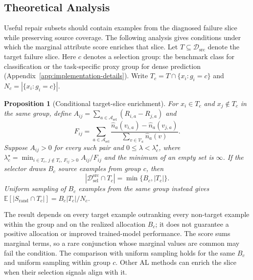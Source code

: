 \documentclass[10pt,twocolumn,letterpaper]{article}
\newcommand{\dataset}{\mathcal{D}}
\newcommand{\selattrs}{\mathcal{A}_{\mathrm{sel}}}
\newcommand{\vals}{\mathcal{V}}
\newtheorem{proposition}{Proposition}
\begin{document}
\subsection{Theoretical Analysis}
\label{subsec:slice-enrichment}

Useful repair subsets should contain examples from the diagnosed failure slice while preserving source coverage. The following analysis gives conditions under which the marginal attribute score enriches that slice. Let $T\subseteq\dataset_{\mathrm{src}}$ denote the target failure slice. Here $c$ denotes a selection group: the benchmark class for classification or the task-specific proxy group for dense prediction (Appendix~\ref{app:implementation-details}). Write $T_c=T\cap\{x_i:g_i=c\}$ and $N_c=|\{x_i:g_i=c\}|$.

\begin{tcolorbox}[
    colback=blue!2!white,
    colframe=blue!20!white,
    arc=3pt,
    boxrule=1pt,
    before skip=3pt,
    after skip=3pt,
    top=3pt,
    bottom=3pt,
    boxsep=1pt,
    drop shadow,
    breakable
]
\begin{proposition}[Conditional target-slice enrichment]
\label{prop:rarity-margin}
For $x_i\in T_c$ and $x_j\notin T_c$ in the same group, define $A_{ij}=\sum_{a\in\selattrs}(R_{i,a}-R_{j,a})$ and
\begin{equation*}
F_{ij}=\sum_{a\in\selattrs}
\frac{\hat n_a(v_{i,a})-\hat n_a(v_{j,a})}{\sum_{v\in\vals_a}\hat n_a(v)}.
\end{equation*}
Suppose $A_{ij}>0$ for every such pair and $0\leq\lambda<\lambda_c^\star$, where $\lambda_c^\star=\min_{i\in T_c,\,j\notin T_c,\,F_{ij}>0}A_{ij}/F_{ij}$ and the minimum of an empty set is $\infty$. If the selector draws $B_c$ source examples from group $c$, then
\begin{equation}
\label{eq:deterministic-enrichment-bound}
|\dataset_{\mathrm{sel}}^{\mathrm{src}}\cap T_c|=\min\{B_c,|T_c|\}.
\end{equation}
Uniform sampling of $B_c$ examples from the same group instead gives $\mathbb{E}[|S_{\mathrm{rand}}\cap T_c|]=B_c|T_c|/N_c$.
\end{proposition}
\end{tcolorbox}

The result depends on every target example outranking every non-target example within the group and on the realized allocation $B_c$; it does not guarantee a positive allocation or improved trained-model performance. The score sums marginal terms, so a rare conjunction whose marginal values are common may fail the condition. The comparison with uniform sampling holds for the same $B_c$ and uniform sampling within group $c$. Other AL methods can enrich the slice when their selection signals align with it.
\end{document}
